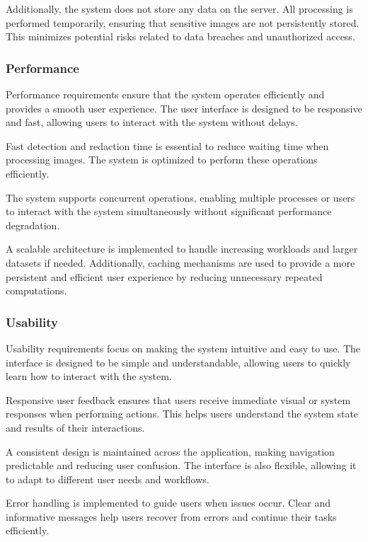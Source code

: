 Additionally, the system does not store any data on the server. All processing is performed temporarily, ensuring that sensitive images are not persistently stored. This minimizes potential risks related to data breaches and unauthorized access.

\subsubsection{Performance}

Performance requirements ensure that the system operates efficiently and provides a smooth user experience. The user interface is designed to be responsive and fast, allowing users to interact with the system without delays.

Fast detection and redaction time is essential to reduce waiting time when processing images. The system is optimized to perform these operations efficiently.

The system supports concurrent operations, enabling multiple processes or users to interact with the system simultaneously without significant performance degradation.

A scalable architecture is implemented to handle increasing workloads and larger datasets if needed. Additionally, caching mechanisms are used to provide a more persistent and efficient user experience by reducing unnecessary repeated computations.

\subsubsection{Usability}

Usability requirements focus on making the system intuitive and easy to use. The interface is designed to be simple and understandable, allowing users to quickly learn how to interact with the system.

Responsive user feedback ensures that users receive immediate visual or system responses when performing actions. This helps users understand the system state and results of their interactions.

A consistent design is maintained across the application, making navigation predictable and reducing user confusion. The interface is also flexible, allowing it to adapt to different user needs and workflows.

Error handling is implemented to guide users when issues occur. Clear and informative messages help users recover from errors and continue their tasks efficiently.

